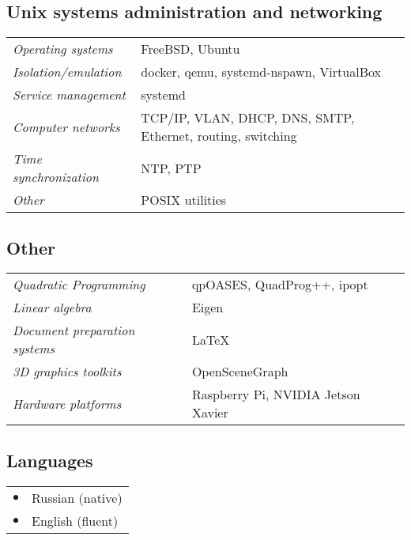 \documentclass[a4paper,10pt]{report}
\begin{document}
\begin{adjustwidth}{0.5cm}{0pt}
\vspace{0.2cm}
\subsection{Unix systems administration and networking}
\begin{adjustwidth}{0.5cm}{0pt}
    \begin{tabularx}{\linewidth}{l X}
        {\it Operating systems}             & FreeBSD, Ubuntu\\
        {\it Isolation/emulation}           & docker, qemu, systemd-nspawn, VirtualBox\\
        {\it Service management}            & systemd\\
        {\it Computer networks}             & TCP/IP, VLAN, DHCP, DNS, SMTP, Ethernet, routing, switching\\
        {\it Time synchronization}          & NTP, PTP\\
        {\it Other}                         & POSIX utilities
    \end{tabularx}
\end{adjustwidth}

\vspace{0.2cm}
\subsection{Other}
\begin{adjustwidth}{0.5cm}{0pt}
    \begin{tabularx}{\linewidth}{l X}
        {\it Quadratic Programming}         & qpOASES, QuadProg++, ipopt \\
        {\it Linear algebra}                & Eigen\\
        {\it Document preparation systems}  & \LaTeX \\
        {\it 3D graphics toolkits}          & OpenSceneGraph \\
        {\it Hardware platforms}            & Raspberry Pi, NVIDIA Jetson Xavier \\
    \end{tabularx}
\end{adjustwidth}

\vspace{0.2cm}
\subsection{Languages}
\begin{adjustwidth}{0.5cm}{0pt}
    \begin{tabularx}{\linewidth}{l X}
        \hfill $\bullet$    & Russian (native) \\
        \hfill $\bullet$    & English (fluent)
    \end{tabularx}
\end{adjustwidth}
\end{adjustwidth}
\end{document}
